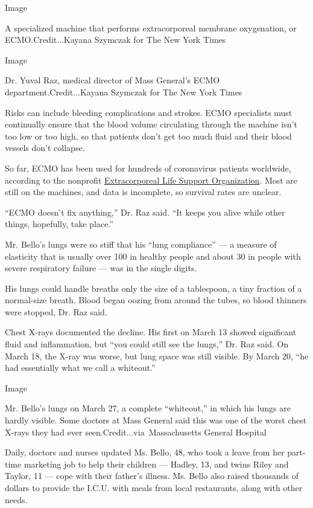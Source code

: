 Image

A specialized machine that performs extracorporeal membrane oxygenation,
or ECMO.Credit...Kayana Szymczak for The New York Times

Image

Dr. Yuval Raz, medical director of Mass General's ECMO
department.Credit...Kayana Szymczak for The New York Times

Risks can include bleeding complications and strokes. ECMO specialists
must continually ensure that the blood volume circulating through the
machine isn't too low or too high, so that patients don't get too much
fluid and their blood vessels don't collapse.

So far, ECMO has been used for hundreds of coronavirus patients
worldwide, according to the nonprofit
\href{https://www.elso.org/Registry/FullCOVID19RegistryDashboard.aspx}{Extracorporeal
Life Support Organization}. Most are still on the machines, and data is
incomplete, so survival rates are unclear.

``ECMO doesn't fix anything,'' Dr. Raz said. ``It keeps you alive while
other things, hopefully, take place.''

Mr. Bello's lungs were so stiff that his ``lung compliance'' --- a
measure of elasticity that is usually over 100 in healthy people and
about 30 in people with severe respiratory failure --- was in the single
digits.

His lungs could handle breaths only the size of a tablespoon, a tiny
fraction of a normal-size breath. Blood began oozing from around the
tubes, so blood thinners were stopped, Dr. Raz said.

Chest X-rays documented the decline. His first on March 13 showed
significant fluid and inflammation, but ``you could still see the
lungs,'' Dr. Raz said. On March 18, the X-ray was worse, but lung space
was still visible. By March 20, ``he had essentially what we call a
whiteout.''

Image

Mr. Bello's lungs on March 27, a complete ``whiteout,'' in which his
lungs are hardly visible. Some doctors at Mass General said this was one
of the worst chest X-rays they had ever seen.Credit...via~Massachusetts
General Hospital

Daily, doctors and nurses updated Ms. Bello, 48, who took a leave from
her part-time marketing job to help their children --- Hadley, 13, and
twins Riley and Taylor, 11 --- cope with their father's illness. Ms.
Bello also raised thousands of dollars to provide the I.C.U. with meals
from local restaurants, along with other needs.

